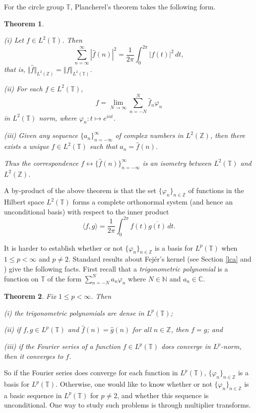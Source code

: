 \documentclass[mstat,12pt]{unswthesis}  %
\newcommand{\C}{\mathbb{C}}
\newcommand{\N}{\mathbb{N}}
\newcommand{\T}{\mathbb{T}}
\newcommand{\Z}{\mathbb{Z}}
\newcommand{\hatt}[1]{\widehat #1}
\def\ip<#1,#2>{\langle #1,#2 \rangle}
\def\norm#1{\left \Vert #1 \right \Vert}
\def\ssnorm#1{\Vert #1 \Vert}
\newtheorem{theorem}{Theorem}[section]
\numberwithin{equation}{section}
\begin{document}
For the circle group $\T$, Plancherel's theorem takes the following form.

\begin{theorem}\label{Plancherel for T}\cite[Theorem I.5.5]{Katznelson}

(i) Let $f\in L^2(\T)$. Then
\[\sum_{n=\infty}^{\infty}|\hatt{f}(n)|^2=
\frac{1}{2\pi}\int_0^{2\pi}|f(t)|^2\,dt,\]
that is, $\ssnorm{\hatt{f}}_{L^2(\Z)}=\norm{f}_{L^2(\T)}$.

(ii) For each $f\in L^2(\T)$,
\[f=\lim_{N\rightarrow\infty}\sum_{n=-N}^N\hatt{f}_n\varphi_n\]
in $L^2(\T)$ norm, where $\varphi_n:t\mapsto e^{int}$.

(iii) Given any sequence $\{a_n\}_{n=-\infty}^{\infty}$ of complex numbers in
$L^2(\Z)$, then there exists a unique $f\in L^2(\T)$ such that
$a_n=\hatt{f}(n)$.

Thus the correspondence $f\leftrightarrow\{\hatt{f}(n)\}_{n=-\infty}^{\infty}$
is an isometry between $L^2(\T)$ and $L^2(\Z)$.
\end{theorem}


A by-product of the above theorem is that the set $\{\varphi_n\}_{n\in\Z}$ of
functions in the Hilbert space $L^2(\T)$ forms a complete orthonormal system 
(and
hence an unconditional basis) with respect to the inner product
\[\ip<f,g>=\frac{1}{2\pi}\int_0^{2\pi}f(t)\overline{g(t)}\,dt.\]

It is harder to establish whether or not $\{\varphi_n\}_{n\in\Z}$ is a basis for
$L^p(\T)$ when $1\leq p<\infty$ and $p\neq2$. Standard results about Fej\'{e}r's
kernel (see Section \ref{lca} and \cite[I.2.6]{Katznelson}) give the following
facts. First recall that a {\em trigonometric polynomial} is a function on 
$\T$ of 
the form $\sum_{n=-N}^Na_n\varphi_n$ where $N\in\N$ and $a_n\in\C$.

\begin{theorem}\label{Fejer facts}
Fix $1\leq p<\infty$. Then

(i) the trigonometric polynomials are dense in $L^p(\T)$;

(ii) if $f,g\in L^p(\T)$ and $\hatt{f}(n)=\hatt{g}(n)$ for all $n\in\Z$,
then $f=g$; and


(iii) if the Fourier series of a function $f\in L^p(\T)$ does converge in
$L^p$-norm, then it converges to $f$.
\end{theorem}

So if the Fourier series does converge for each function in $L^p(\T)$,
$\{\varphi_n\}_{n\in\Z}$ is a basis for $L^p(\T)$. Otherwise,
one would like to know whether or not $\{\varphi_n\}_{n\in\Z}$ is a basic 
sequence in $L^p(\T)$ for $p\neq2$, and whether this sequence is unconditional.
One way to study such problems is through multiplier transforms.
\end{document}
